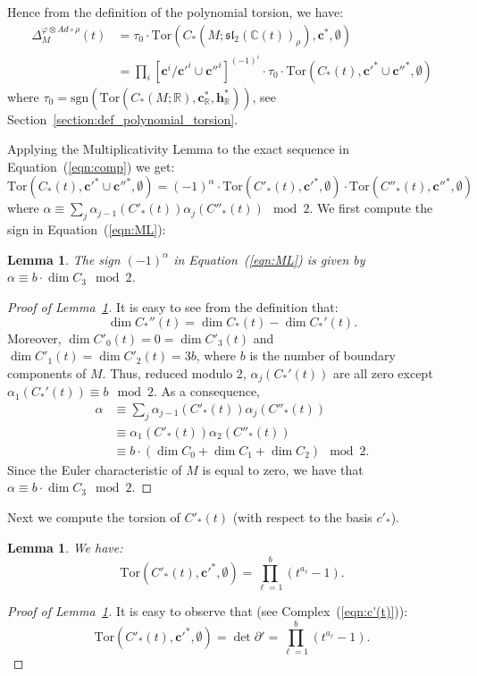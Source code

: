 \documentclass[a4paper]{amsart}
\theoremstyle{plain}
\newtheorem{lemma}[theorem]{Lemma}%
\theoremstyle{definition}
\theoremstyle{remark}
\newcommand{\CC}{{\mathbb C}}
\newcommand{\IR}{{\mathbb R}}
\newcommand{\sllrhot}{\mathfrak{sl}_2(\CC(t))_\rho}
\newcommand{\PolyTors}[2]{\Delta_{#1}^{#2}}
\newcommand{\Tor}[3]{\mathrm{Tor} ({#1}, {#2}, {#3})}
\newcommand{\otAd}[2]{#1 \otimes Ad \circ #2}
\newcommand{\cbasis}[2][c]{\mathbf{#1}^{#2}}
\newcommand{\hbasis}[2][h]{\mathbf{#1}^{#2}}
\begin{document}
Hence from the definition of the polynomial torsion, we have:
\begin{align}
  \PolyTors{M}{\otAd{\varphi}{\rho}}(t) 
  &= \tau_0 \cdot
  \Tor{C_*(M; \sllrhot)}{\cbasis{*}}{\emptyset} \nonumber \\
  &= \prod_i [ \cbasis{i} / \cbasis[c']{i} \cup \cbasis[c'']{i}
  ]^{(-1)^{i}} \cdot \tau_0 \cdot \Tor{C_*(t)}{\cbasis[c']{*} \cup
    \cbasis[c'']{*}}{\emptyset}    \label{eqn:DE}
\end{align}
where $\tau_0 = \mathrm{sgn} \left(
  \Tor{C_*(M;\IR)}{\cbasis{*}_\IR}{\hbasis{*}_\IR} \right)$, see
Section~\ref{section:def_polynomial_torsion}.

Applying the Multiplicativity Lemma to the exact
sequence in Equation~(\ref{eqn:comp}) we get:
\begin{equation}\label{eqn:ML}
  \Tor{C_*(t)}{\cbasis[c']{*} \cup \cbasis[c'']{*}}{\emptyset} 
  = (-1)^\alpha \cdot 
  \Tor{C'_*(t)}{\cbasis[c']{*}}{\emptyset} \cdot
  \Tor{C''_*(t)}{\cbasis[c'']{*}}{\emptyset}
\end{equation}
where $\alpha \equiv \sum_j \alpha_{j-1}(C'_*(t)) \alpha_j(C''_*(t))
\mod 2$.  We first compute the sign in Equation~(\ref{eqn:ML}):
\begin{lemma}\label{lemma:sgn}
  The sign $(-1)^\alpha$ in Equation~(\ref{eqn:ML}) is given by $\alpha \equiv {b \cdot \dim C_3} \mod 2$.
\end{lemma}
\begin{proof}[Proof of Lemma~\ref{lemma:sgn}]
  It is easy to see from the definition that:
  \[
  \dim C_*''(t) = \dim C_*(t) - \dim C_*'(t).
  \]
  Moreover, $\dim C'_0(t) = 0 = \dim C'_3(t)$ and $\dim C'_1(t) = \dim
  C'_2(t) = 3b$, where $b$ is the number of boundary components of
  $M$.  Thus, reduced modulo 2, $\alpha_j(C_*'(t))$ are all zero
  except $\alpha_1(C_*'(t)) \equiv b \mod 2$.  As a consequence,
  \begin{align*}
    \alpha
    &\equiv \sum_j \alpha_{j-1}(C'_*(t)) \alpha_j(C''_*(t)) \\
    &\equiv \alpha_1(C'_*(t)) \alpha_2(C''_*(t)) \\
    &\equiv b \cdot (\dim C_0 + \dim C_1 + \dim C_2) \mod 2.
  \end{align*}
  Since the Euler characteristic of $M$ is equal to zero, we have that $\alpha \equiv b \cdot \dim C_3 \mod 2$.
\end{proof}

Next we compute the torsion of $C'_*(t)$ (with respect to the basis
$c'_*$).
\begin{lemma}\label{lemma:torsC'}
  We have:
  \begin{equation}\label{eqn:torsC'}
    \Tor{C'_*(t)}{\cbasis[c']{*}}{\emptyset} 
    = \prod_{\ell=1}^b (t^{a_\ell} - 1).
  \end{equation}
\end{lemma}
\begin{proof}[Proof of Lemma~\ref{lemma:torsC'}]
  It is easy to observe that (see Complex~(\ref{eqn:c'(t)})):
  \[
  \Tor{C'_*(t)}{\cbasis[c']{*}}{\emptyset}
  = \det \partial' = \prod_{\ell=1}^b (t^{a_\ell} - 1).
  \]
\end{proof}
\end{document}
